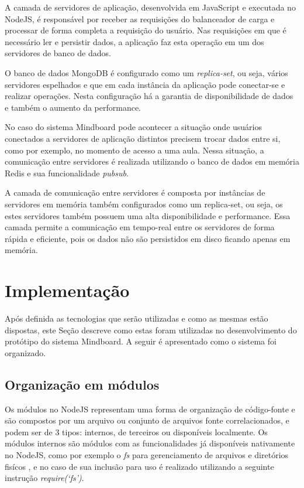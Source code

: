A camada de servidores de aplicação, desenvolvida em JavaScript e executada no NodeJS, é responsável por receber as requisições do balanceador de carga e processar de forma completa a requisição do usuário. Nas requisições em que é necessário ler e persistir dados, a aplicação faz esta operação em um dos servidores de banco de dados. 

O banco de dados MongoDB é configurado como um \emph{replica-set}, ou seja, vários servidores espelhados e que em cada instância da aplicação pode conectar-se e realizar operações. Nesta configuração há a garantia de disponibilidade de dados e também o aumento da performance.

No caso do sistema Mindboard pode acontecer a situação onde usuários conectados a servidores de aplicação distintos precisem trocar dados entre si, como por exemplo, no momento de acesso a uma aula. Nessa situação, a comunicação entre servidores é realizada utilizando o banco de dados em memória Redis e sua funcionalidade \emph{pubsub}.

A camada de comunicação entre servidores é composta por instâncias de servidores em memória também configurados como um replica-set, ou seja, os estes servidores também possuem uma alta disponibilidade e performance. Essa camada permite a comunicação em tempo-real entre os servidores de forma rápida e eficiente, pois os dados não são persistidos em disco ficando apenas em memória.


\section{Implementação}
\label{sec:implementacao}

Após definida as tecnologias que serão utilizadas e como as mesmas estão dispostas, este Seção descreve como estas foram utilizadas no desenvolvimento do protótipo do sistema Mindboard. A seguir é apresentado como o sistema foi organizado.


\subsection{Organização em módulos}
\label{sec:organizacao_mods}

Os módulos no NodeJS representam uma forma de organização de código-fonte e são compostos por um arquivo ou conjunto de arquivos fonte correlacionados, e podem ser de 3 tipos: internos, de terceiros ou disponíveis localmente. Os módulos internos são módulos com as funcionalidades já disponíveis nativamente no NodeJS, como por exemplo o \emph{fs} para gerenciamento de arquivos e diretórios fisícos \cite{node_modules}, e no caso de sua inclusão para uso é realizado utilizando a seguinte instrução \emph{require(`fs')}.

